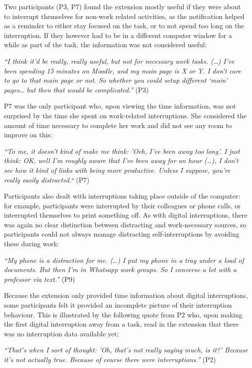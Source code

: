 Two participants (P3, P7) found the extension mostly useful if they were about to interrupt themselves for non-work related activities, as the notification helped as a reminder to either stay focused on the task, or to not spend too long on the interruption. If they however had to be in a different computer window for a while as part of the task, the information was not considered useful:

\textit{“I think it'd be really, really useful, but not for necessary work tasks. (…) I’ve been spending 15 minutes on Moodle, and my main page is X or Y. I don’t care to go to that main page or not. So whether you could setup different ‘main’ pages… but then that would be complicated.”} (P3)

P7 was the only participant who, upon viewing the time information, was not surprised by the time she spent on work-related interruptions. She considered the amount of time necessary to complete her work and did not see any room to improve on this: 

\textit{“To me, it doesn't kind of make me think: 'Oeh, I've been away too long'. I just think: OK, well I'm roughly aware that I've been away for an hour (…), I don't see how it kind of links with being more productive. Unless I suppose, you're really easily distracted.“} (P7)

Participants also dealt with interruptions taking place outside of the computer: for example, participants were interrupted by their colleagues or phone calls, or interrupted themselves to print something off. As with digital interruptions, there was again no clear distinction between distracting and work-necessary sources, so participants could not always manage distracting self-interruptions by avoiding these during work:

\textit{“My phone is a distraction for me. (…) I put my phone in a tray under a load of documents. But then I’m in Whatsapp work groups. So I converse a lot with a professor via text.”} (P9)

Because the extension only provided time information about digital interruptions, some participants felt it provided an incomplete picture of their interruption behaviour. This is illustrated by the following quote from P2 who, upon making the first digital interruption away from a task, read in the extension that there was no interruption data available yet: 

\textit{“That's when I sort of thought: 'Oh, that's not really saying much, is it?' Because it's not actually true. Because of course there were interruptions.”} (P2)

